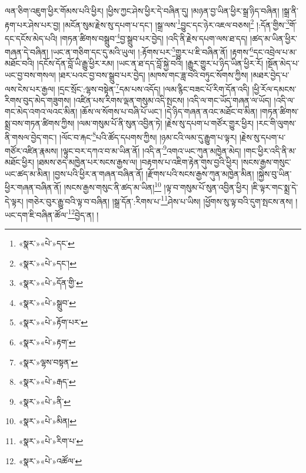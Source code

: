 ལན་ཅིག་འཇུག་ཕྱིར་གོམས་པའི་ཕྱིར། །ཕྱིས་ཀྱང་ཤེས་ཕྱིར་དེ་བཞིན་དུ། །མཉན་བྱ་ཡིན་ཕྱིར་སྒྲ་ཉིད་བཞིན། །སྒྲ་ནི་རྟག་པར་ཤེས་པར་བྱ། །མངོན་སུམ་རྗེས་སུ་དཔག་པ་དང་། །སྒྲ་ལས་\footnote{«སྣར་»«པེ་»དང་}བྱུང་དང་ཉེར་འཇལ་བཅས།\footnote{«སྣར་»«པེ་»དང་།} །:དོན་གྱིས་\footnote{«སྣར་»«པེ་»དོན་གྱི་}གོ་དང་དངོས་མེད་པའི། །གཏན་ཚིགས་བསྒྲུབ་\footnote{«སྣར་»«པེ་»སྒྲུབ་}བྱ་སྒྲུབ་པར་བྱེད། །འདི་ནི་རྗེས་དཔག་ལས་ཐ་དད། །ཚད་མ་ཡིན་ཕྱིར་གཞན་དེ་བཞིན། །ཡང་ན་གཅིག་དང་དུ་མའི་ཡུལ། །:རྟོགས་པར་\footnote{«སྣར་»«པེ་»རྟོག་པར་}གྱུར་པ་ཇི་བཞིན་ནོ། །རྟགས་\footnote{«སྣར་»«པེ་»རྟག་}དང་འབྲེལ་པ་མ་མཐོང་བའི། །དངོས་དོན་བློ་ཡི་རྒྱུ་ཕྱིར་རམ། །ཡང་ན་ཐ་དད་བློ་སྐྱེ་བའི། །རྒྱུར་གྱུར་པ་ཉིད་ཡིན་ཕྱིར་རོ། །སྔོན་མེད་པ་ཡང་བྱ་བས་གསལ། །ཐར་པའང་བྱ་བས་སྒྲུབ་པར་བྱེད། །མཁས་གང་ཟླ་བའི་བཏུང་སོགས་ཀྱིས། །མཐར་བྱེད་པ་ལས་ངེས་པར་རྒྱལ། །དྲང་སྲོང་:ལྷས་བསྟེན་\footnote{«སྣར་»ལྷས་བསྟན་}དམ་པས་འདོད། །ལམ་རྙིང་བཟང་པོ་རིག་དོན་འདི། །ཕྱི་རོལ་དམངས་རིགས་བུད་མེད་གཟུགས། །འཛིན་པས་རིགས་ལྡན་གསུམ་འདི་སྤངས། །འདི་ལ་གང་ཡོད་གཞན་ལ་ཡོད། །འདི་ལ་གང་མེད་འགའ་ལའང་མིན། །ཆོས་ལ་སོགས་པ་བཞི་པོ་ཡང་། །དེ་ཉིད་གཞན་ནའང་མཐོང་བ་མིན། །གཏན་ཚིགས་སྨྲ་བས་གཏན་ཚིགས་ཀྱིས། །ལམ་གསུམ་པོ་ནི་སུན་འབྱིན་ཏེ། །རྗེས་སུ་དཔག་པ་གཙོར་གྱུར་ཕྱིར། །རང་གི་ལུགས་ནི་གསལ་བྱེད་གང་། །ལོང་བ་རྐང་\footnote{«སྣར་»«པེ་»རྒད་}པའི་ཚོད་དཔགས་ཀྱིས། །ཉམ་ངའི་ལམ་དུ་རྒྱུག་པ་ལྟར། །རྗེས་སུ་དཔག་པ་གཙོར་འཛིན་རྣམས། །ལྟུང་བར་དཀའ་བ་མ་ཡིན་ནོ། །འདི་ན་\footnote{«སྣར་»«པེ་»ནི་}འགའ་ཡང་ཀུན་མཁྱེན་མེད། །གང་ཕྱིར་འདི་ནི་མ་མཐོང་ཕྱིར། །ཐམས་ཅད་མཁྱེན་པར་སངས་རྒྱས་ལ། །བརྟགས་པ་འཇིག་རྟེན་གུས་བྱའི་ཕྱིར། །སངས་རྒྱས་གསུང་ཡང་ཚད་མ་མིན། །བྱས་པའི་ཕྱིར་ན་གཞན་བཞིན་ནོ། །རྫོགས་པའི་སངས་རྒྱས་ཀུན་མཁྱེན་མིན། །སྐྱེས་བུ་ཡིན་ཕྱིར་གཞན་བཞིན་ནོ། །སངས་རྒྱས་གསུང་ནི་ཚད་མ་ཡིན།\footnote{«སྣར་»«པེ་»མིན།} །ལྟ་བ་གསུམ་པོ་སུན་འབྱིན་ཕྱིར། །ཇི་ལྟར་གང་སྨྲ་དེ་དེ་ལྟར། །གཅེར་བུར་རྒྱུ་བའི་ལྟ་བ་བཞིན། །སྒྲ་དོན་:རིགས་པ་\footnote{«སྣར་»«པེ་»རིག་པ་}ཤེས་པ་ཡིས། །ཕྱོགས་སུ་ལྟ་བའི་དུག་སྤངས་ནས། །ཡང་དག་ཇི་བཞིན་ཚོལ་\footnote{«སྣར་»«པེ་»འཚོལ་}བྱེད་ན། །
